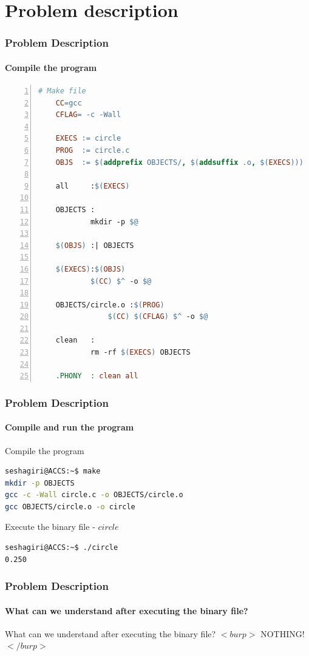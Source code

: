 \documentclass[12pt]{beamer}
\begin{document}
\section{Problem description}
\begin{frame}[fragile]
	\frametitle{Problem Description}
	\framesubtitle{Compile the program}
	\tiny
	\begin{lstlisting}[language=make, breaklines=true, commentstyle=\color{mygreen}, frame=shadowbox, rulecolor=\color{black}, numbers=left,  numbersep=2pt, numberstyle=\tiny\color{mygray}]
	# Make file
	CC=gcc
	CFLAG= -c -Wall

	EXECS := circle
	PROG  := circle.c
	OBJS  := $(addprefix OBJECTS/, $(addsuffix .o, $(EXECS)))

	all     :$(EXECS)

	OBJECTS :
    		mkdir -p $@

	$(OBJS) :| OBJECTS

	$(EXECS):$(OBJS)
            $(CC) $^ -o $@

	OBJECTS/circle.o :$(PROG)
                $(CC) $(CFLAG) $^ -o $@

	clean   :
    		rm -rf $(EXECS) OBJECTS

	.PHONY  : clean all
	\end{lstlisting}			
\end{frame}
\begin{frame}[fragile]
	\frametitle{Problem Description}
	\framesubtitle{Compile and run the program}
	\tiny
	\begin{block}{Compile the program}
		\begin{lstlisting}[language=bash]
seshagiri@ACCS:~$ make
mkdir -p OBJECTS
gcc -c -Wall circle.c -o OBJECTS/circle.o
gcc OBJECTS/circle.o -o circle
    	\end{lstlisting}
    \end{block}
    
	\begin{block}{Execute the binary file - $circle$}
		\begin{lstlisting}[language=bash]
seshagiri@ACCS:~$ ./circle
0.250
		\end{lstlisting}
	\end{block}
\end{frame}

\begin{frame}
	\frametitle{Problem Description}
	\framesubtitle{What can we understand after executing the binary file?}
	\begin{center}
		\small What can we understand after executing the binary file?
		\small{$<burp>$} \huge {NOTHING!} \small {$</burp>$}
	\end{center}
\end{frame}
\end{document}
